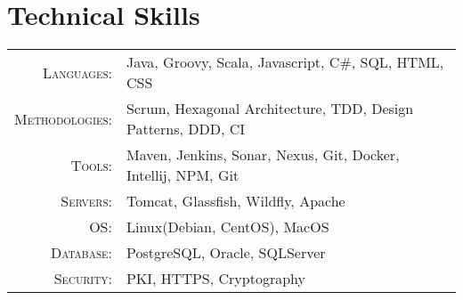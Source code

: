 \documentclass[a4paper,11pt]{article}
\begin{document}
    \section{Technical Skills}
    \begin{tabular}{rl}
        \textsc{Languages:}& Java, Groovy, Scala, Javascript, C\#, SQL, HTML, CSS\\
        \textsc{Methodologies:}& Scrum, Hexagonal Architecture, TDD, Design Patterns, DDD, CI\\
        \textsc{Tools:}& Maven, Jenkins, Sonar, Nexus, Git, Docker, Intellij, NPM, Git\\
        \textsc{Servers:}& Tomcat, Glassfish, Wildfly, Apache\\
        \textsc{OS:}& Linux(Debian, CentOS), MacOS\\
        \textsc{Database:}& PostgreSQL, Oracle, SQLServer\\
        \textsc{Security:}& PKI, HTTPS, Cryptography\\
    \end{tabular}
\end{document}
